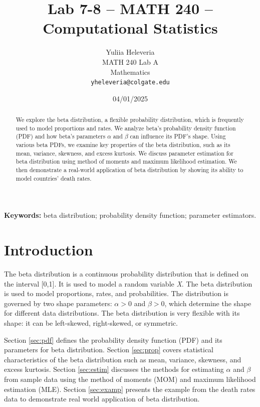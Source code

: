 \documentclass{article}\usepackage[]{graphicx}\usepackage[]{xcolor}
\begin{document}
\vspace{-1in}
\title{Lab 7-8 -- MATH 240 -- Computational Statistics}

\author{
  Yuliia Heleveria \\
  MATH 240 Lab A  \\
  Mathematics  \\
  {\tt yheleveria@colgate.edu}
}

\date{04/01/2025}

\maketitle

\begin{multicols}{2}
 \raggedcolumns
\begin{abstract}
We explore the beta distribution, a flexible probability distribution, which is frequently used to model proportions and rates. We analyze beta's probability density function (PDF) and how beta's parameters $\alpha$ and $\beta$ can influence its PDF's shape. Using various beta PDFs, we examine key properties of the beta distribution, such as its mean, variance, skewness, and excess kurtosis. We discuss parameter estimation for beta distribution using method of moments and maximum likelihood estimation. We then demonstrate a real-world application of beta distribution by showing its ability to model countries' death rates.
\end{abstract}

\noindent \textbf{Keywords:} beta distribution; probability density function; parameter estimators.

\section{Introduction}
The beta distribution is a continuous probability distribution that is defined on the interval [0,1]. It is used to model a random variable \textit{X}. The beta distribution is used to model proportions, rates, and probabilities. The distribution is governed by two shape parameters: $\alpha > 0$ and $\beta > 0$, which determine the shape for different data distributions. The beta distribution is very flexible with its shape: it can be left-skewed, right-skewed, or symmetric. 


Section \ref{sec:pdf} defines the probability density function (PDF) and its parameters for beta distribution. Section \ref{sec:prop} covers statistical characteristics of the beta distribution such as mean, variance, skewness, and excess kurtosis. Section \ref{sec:estim} discusses the methods for estimating $\alpha$ and $\beta$ from sample data using the method of moments (MOM) and maximum likelihood estimation (MLE). Section \ref{sec:examp} presents the example from the death rates data to demonstrate real world application of beta distribution.




\end{multicols}
\end{document}
